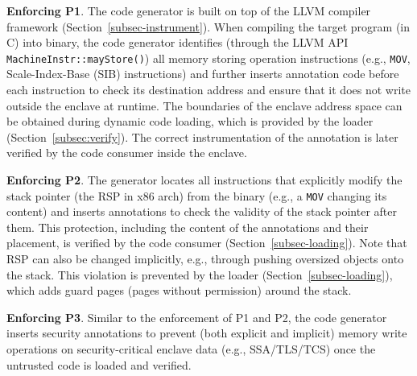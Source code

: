 \vspace{3pt}\noindent\textbf{Enforcing P1}.  The code generator is built on top of the LLVM compiler framework (Section~\ref{subsec-instrument}). When compiling the target program (in C) into binary, the code generator identifies (through the LLVM API \verb|MachineInstr::mayStore()|) all memory storing operation instructions (e.g., \texttt{MOV}, Scale-Index-Base (SIB) instructions) and further inserts annotation code before each instruction to check its destination address and ensure that it does not write outside the enclave at runtime. 
The boundaries of the enclave address space can be obtained during dynamic code loading, which is provided by the loader (Section~\ref{subsec:verify}). The correct instrumentation of the annotation is later verified by the code consumer inside the enclave. 


\vspace{3pt}\noindent\textbf{Enforcing P2}. 
The generator locates all instructions that explicitly modify the stack pointer (the RSP in x86 arch) from the binary (e.g., a \texttt{MOV} changing its content) and inserts annotations to check the validity of the stack pointer after them. This protection, including the content of the annotations and their placement, is verified by the code consumer (Section~\ref{subsec-loading}). 
Note that RSP can also be changed implicitly, e.g., through pushing oversized objects onto the stack. This violation is prevented by the loader (Section~\ref{subsec-loading}), which adds guard pages (pages without permission) around the stack. 


\vspace{3pt}\noindent\textbf{Enforcing P3}. Similar to the enforcement of P1 and P2, the code generator inserts security annotations to prevent (both explicit and implicit) memory write operations on security-critical enclave data (e.g., SSA/TLS/TCS) once the untrusted code is loaded and verified. 

